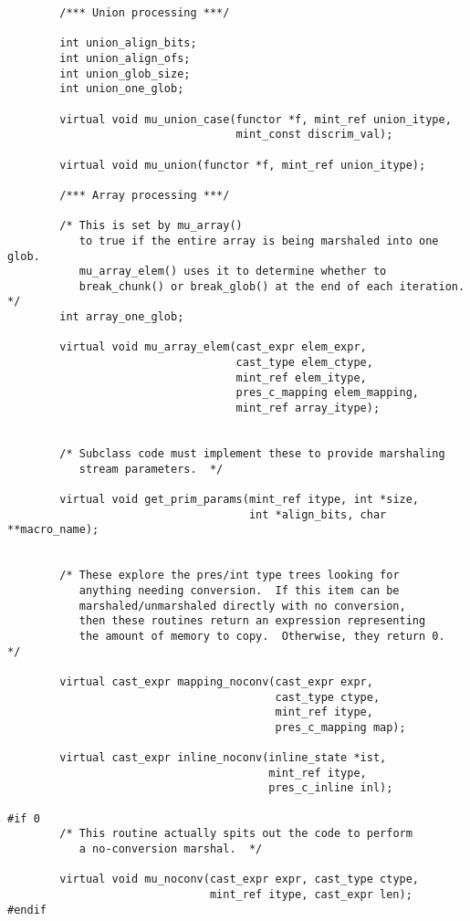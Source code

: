 \begin{verbatim}
        /*** Union processing ***/

        int union_align_bits;
        int union_align_ofs;
        int union_glob_size;
        int union_one_glob;

        virtual void mu_union_case(functor *f, mint_ref union_itype,
                                   mint_const discrim_val);

        virtual void mu_union(functor *f, mint_ref union_itype);

        /*** Array processing ***/

        /* This is set by mu_array()
           to true if the entire array is being marshaled into one glob.
           mu_array_elem() uses it to determine whether to
           break_chunk() or break_glob() at the end of each iteration.  */
        int array_one_glob;

        virtual void mu_array_elem(cast_expr elem_expr,
                                   cast_type elem_ctype,
                                   mint_ref elem_itype,
                                   pres_c_mapping elem_mapping,
                                   mint_ref array_itype);


        /* Subclass code must implement these to provide marshaling
           stream parameters.  */

        virtual void get_prim_params(mint_ref itype, int *size,
                                     int *align_bits, char **macro_name);


        /* These explore the pres/int type trees looking for
           anything needing conversion.  If this item can be
           marshaled/unmarshaled directly with no conversion,
           then these routines return an expression representing
           the amount of memory to copy.  Otherwise, they return 0.  */

        virtual cast_expr mapping_noconv(cast_expr expr,
                                         cast_type ctype,
                                         mint_ref itype,
                                         pres_c_mapping map);

        virtual cast_expr inline_noconv(inline_state *ist,
                                        mint_ref itype,
                                        pres_c_inline inl);

#if 0
        /* This routine actually spits out the code to perform
           a no-conversion marshal.  */

        virtual void mu_noconv(cast_expr expr, cast_type ctype,
                               mint_ref itype, cast_expr len);
#endif


\end{verbatim}
